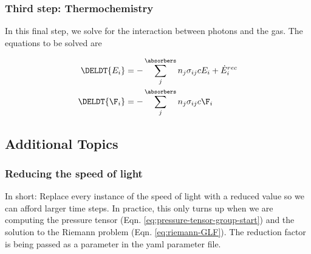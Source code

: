\subsubsection{Third step: Thermochemistry}


In this final step, we solve for the interaction between photons and the gas.
The equations to be solved are

\begin{align}
	\DELDT{E_i}  &=
		- \sum\limits_{j}^{\absorbers} n_j \sigma_{i j} c E_i + \dot E_i ^{rec} \label{eq:thermochemistry-E} \\
	\DELDT{\F_i} &=
		- \sum\limits_{j}^{\absorbers} n_j \sigma_{i j} c \F_i \label{eq:thermochemistry-F}
\end{align}












\subsection{Additional Topics}


\subsubsection{Reducing the speed of light}

In short: Replace every instance of the speed of light with a reduced value so we can afford larger
time steps. In practice, this only turns up when we are computing the pressure tensor (Eqn.
\ref{eq:pressure-tensor-group-start}) and the solution to the Riemann problem (Eqn.
\ref{eq:riemann-GLF}). The reduction factor is being passed as a parameter in the yaml parameter
file.


